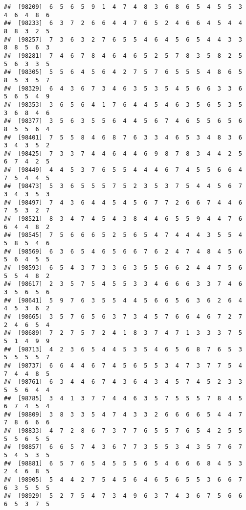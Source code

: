 \documentclass[
]{book}
\begin{document}
\begin{verbatim}
##  [98209]  6  5  6  5  9  1  4  7  4  8  3  6  8  6  5  4  5  5  3  4  6  4  8  6
##  [98233]  6  3  7  2  6  6  4  4  7  6  5  2  4  6  6  4  5  4  4  8  8  3  2  5
##  [98257]  7  3  6  3  2  7  6  5  5  4  6  4  5  6  5  4  4  3  3  8  8  5  6  3
##  [98281]  7  4  6  7  8  4  6  4  6  5  2  5  7  8  3  5  8  2  5  5  6  3  3  5
##  [98305]  5  5  6  4  5  6  4  2  7  5  7  6  5  5  5  4  8  6  5  8  5  3  5  7
##  [98329]  6  4  3  6  7  3  4  6  3  5  3  5  4  5  6  6  3  3  6  5  6  5  4  9
##  [98353]  3  6  5  6  4  1  7  6  4  4  5  4  6  3  5  6  5  3  5  3  6  8  4  6
##  [98377]  3  5  6  3  5  5  6  4  4  5  6  7  4  6  5  5  6  5  6  8  5  5  6  4
##  [98401]  7  5  5  8  4  6  8  7  6  3  3  4  6  5  3  4  8  3  6  3  4  3  5  2
##  [98425]  7  3  3  7  4  4  6  4  4  6  9  8  7  8  3  4  4  2  5  6  7  4  2  5
##  [98449]  4  4  5  3  7  6  5  5  4  4  4  6  7  4  5  5  6  6  4  7  5  4  4  5
##  [98473]  5  3  6  5  5  5  7  5  2  3  5  3  7  5  4  4  5  6  7  3  4  3  5  3
##  [98497]  7  4  3  6  4  4  5  4  5  6  7  7  2  6  6  7  4  4  6  7  5  3  2  7
##  [98521]  8  3  4  7  4  5  4  3  8  4  4  6  5  5  9  4  4  7  6  6  4  4  8  2
##  [98545]  7  5  6  6  6  5  2  5  6  5  4  7  4  4  4  3  5  5  4  5  8  5  4  6
##  [98569]  6  3  6  5  4  6  5  6  6  7  6  2  4  7  4  8  4  5  6  5  6  4  5  5
##  [98593]  6  5  4  3  7  3  3  6  3  5  5  6  6  2  4  4  7  5  6  5  5  4  8  2
##  [98617]  2  3  5  7  5  4  5  5  3  3  4  6  6  6  3  3  7  4  6  3  5  6  5  6
##  [98641]  5  9  7  6  3  5  5  4  4  5  6  6  5  6  3  6  2  6  4  4  5  3  6  2
##  [98665]  3  5  7  6  5  6  3  7  3  4  5  7  6  6  4  6  7  2  7  2  4  6  5  4
##  [98689]  7  2  7  5  7  2  4  1  8  3  7  4  7  1  3  3  3  7  5  5  1  4  9  9
##  [98713]  4  2  3  6  5  4  4  5  3  5  4  6  5  6  8  7  6  5  3  5  5  5  5  7
##  [98737]  6  6  4  4  6  7  4  5  6  5  5  3  4  7  3  7  7  5  4  7  4  4  8  5
##  [98761]  6  3  4  4  6  7  4  3  6  4  3  4  5  7  4  5  2  3  3  5  5  6  4  4
##  [98785]  3  4  1  3  7  7  4  4  6  3  5  7  5  5  5  7  8  4  5  6  7  4  5  4
##  [98809]  3  8  3  3  5  4  7  4  3  3  2  6  6  6  6  5  4  4  7  7  8  6  6  6
##  [98833]  4  7  2  8  6  7  3  7  7  6  5  5  7  6  5  4  2  5  5  5  5  6  5  5
##  [98857]  6  6  5  7  4  3  6  7  7  3  5  5  3  4  3  5  7  6  7  5  4  5  3  5
##  [98881]  6  5  7  6  5  4  5  5  5  6  5  4  6  6  6  8  4  5  3  2  4  6  8  5
##  [98905]  5  4  4  2  7  5  4  5  6  4  6  5  6  5  5  3  6  6  7  6  3  5  5  5
##  [98929]  5  2  7  5  4  7  3  4  9  6  3  7  4  3  6  7  5  6  6  6  5  3  7  5

\end{verbatim}
\end{document}
